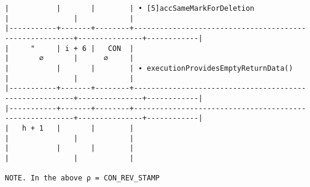 \documentclass[varwidth=\maxdimen,margin=0.5cm,multi={verbatim}]{standalone}
\begin{document}
\begin{verbatim}
|           |       |        | • [5]accSameMarkForDeletion                            |               |            |
|-----------+-------+--------+--------------------------------------------------------+---------------+------------|
|     "     | i + 6 |   CON  |                                                        |       ∅       |      ∅     |
|           |       |        | ∙ executionProvidesEmptyReturnData()                   |               |            |
|-----------+-------+--------+--------------------------------------------------------+---------------+------------|
|-----------+-------+--------+--------------------------------------------------------+---------------+------------|
|   h + 1   |       |        |                                                        |               |            |
|           |       |        |                                                        |               |            |

NOTE. In the above ρ = CON_REV_STAMP
\end{verbatim}
\end{document}
